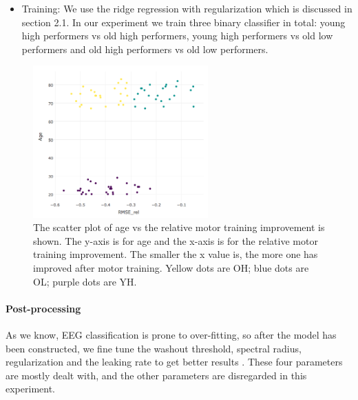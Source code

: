 \documentclass[a4paper,11pt,oneside]{article}
\begin{document}
\begin{itemize}
	\item Training: We use the ridge regression with regularization which is discussed in section 2.1. In our experiment we train three binary classifier in total: young high performers vs old high performers, young high performers vs old low performers and old high performers vs old low performers.
	
\end{itemize}
\begin{figure}[h]
	\centering
	\includegraphics[width=0.6\textwidth]{img/scatter}
	\caption{The scatter plot of age vs the relative motor training improvement is shown. The y-axis is for age and the x-axis is for the relative motor training improvement. The smaller the x value is, the more one has improved after motor training. Yellow dots are OH; blue dots are OL; purple dots are YH.}
\end{figure}

\paragraph{Post-processing}
As we know, EEG classification is prone to over-fitting, so after the model has been constructed, we fine tune the washout threshold, spectral radius, regularization and the leaking rate to get better results \cite{lukovsevivcius2012practical}. These four parameters are mostly dealt with, and the other parameters are disregarded in this experiment.
\end{document}

